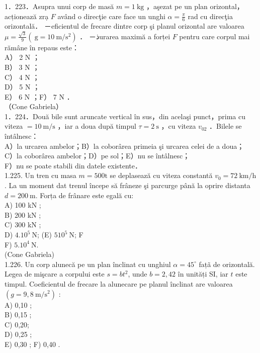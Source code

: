{1．223．Asupra unui corp de masă $m=1 \mathrm{~kg}$ ，aşezat pe un plan orizontal，acționează zrạ $F$ având o direcţie care face un unghi $\alpha=\frac{\pi}{6}$ rad cu direcţia orizontală． －eficientul de frecare dintre corp şi planul orizontal are valoarea $\mu=\frac{\sqrt{3}}{9}\left(\mathrm{~g}=10 \mathrm{~m} / \mathrm{s}^{2}\right)$ ． －ذurarea maximă a forței $F$ pentru care corpul mai rămâne în repaus este：\\
A） 2 N ；\\
B） 3 N ；\\
C） 4 N ；\\
D） 5 N ；\\
E） 6 N ；F） 7 N ．\\
（Cone Gabriela）\\
1．224．Două bile sunt aruncate vertical în sus，din acelaşi punct，prima cu viteza $=10 \mathrm{~m} / \mathrm{s}$ ，iar a doua după timpul $\tau=2 \mathrm{~s}$ ，cu viteza $v_{02}$ ．Bilele se întâlnesc：\\
A）la urcarea ambelor；B）la coborârea primeia şi urcarea celei de a doua；\\
C）la coborârea ambelor；D）pe sol；E）nu se întâlnesc；\\
F）nu se poate stabili din datele existente．\\
1.225. Un tren cu masa $m=500 \mathrm{t}$ se deplasează cu viteza constantă $v_{0}=72 \mathrm{~km} / \mathrm{h}$. La un moment dat trenul începe să frâneze şi parcurge până la oprire distanta $d=200 \mathrm{~m}$. Forța de frânare este egală cu:\\
A) 100 kN ;\\
B) 200 kN ;\\
C) 300 kN ;\\
D) $4.10^{5} \mathrm{~N}$; (E) $510^{5} \mathrm{~N}$; F\\
F) $5.10^{4} \mathrm{~N}$.\\
(Cone Gabriela)\\
1.226. Un corp alunecă pe un plan înclinat cu unghiul $\alpha=45^{\circ}$ fațã de orizontală. Legea de mişcare a corpului este $s=b t^{2}$, unde $b=2,42$ în unități SI, iar $t$ este timpul. Coeficientul de frecare la alunecare pe planul înclinat are valoarea $\left(g=9,8 \mathrm{~m} / \mathrm{s}^{2}\right)$ :\\
A) 0,10 ;\\
B) 0,15 ;\\
C) 0,20;\\
D) 0,25 ;\\
E) 0,30 ; F) 0,40 .\\
}
